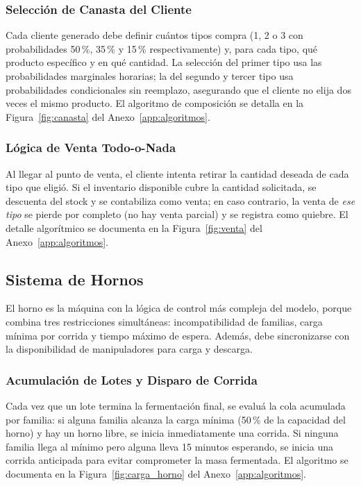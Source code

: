 \documentclass[10pt, a4paper]{article}
\begin{document}
\subsubsection{Selecci\'on de Canasta del Cliente}

Cada cliente generado debe definir cu\'antos tipos compra (1, 2 o 3 con
probabilidades 50\,\%, 35\,\% y 15\,\% respectivamente) y, para cada tipo,
qu\'e producto espec\'ifico y en qu\'e cantidad. La selecci\'on del primer
tipo usa las probabilidades marginales horarias; la del segundo y tercer tipo
usa probabilidades condicionales sin reemplazo, asegurando que el cliente no
elija dos veces el mismo producto. El algoritmo de composici\'on se detalla
en la Figura~\ref{fig:canasta} del Anexo~\ref{app:algoritmos}.

\subsubsection{L\'ogica de Venta Todo-o-Nada}

Al llegar al punto de venta, el cliente intenta retirar la cantidad deseada
de cada tipo que eligi\'o. Si el inventario disponible cubre la cantidad
solicitada, se descuenta del stock y se contabiliza como venta; en caso
contrario, la venta de \emph{ese tipo} se pierde por completo (no hay venta
parcial) y se registra como quiebre. El detalle algor\'itmico se documenta
en la Figura~\ref{fig:venta} del Anexo~\ref{app:algoritmos}.

\subsection{Sistema de Hornos}

El horno es la m\'aquina con la l\'ogica de control m\'as compleja del modelo,
porque combina tres restricciones simult\'aneas: incompatibilidad de familias,
carga m\'inima por corrida y tiempo m\'aximo de espera. Adem\'as, debe
sincronizarse con la disponibilidad de manipuladores para carga y descarga.

\subsubsection{Acumulaci\'on de Lotes y Disparo de Corrida}

Cada vez que un lote termina la fermentaci\'on final, se evalu\'a la cola
acumulada por familia: si alguna familia alcanza la carga m\'inima (50\,\% de la
capacidad del horno) y hay un horno libre, se inicia inmediatamente una
corrida. Si ninguna familia llega al m\'inimo pero alguna lleva 15 minutos
esperando, se inicia una corrida anticipada para evitar comprometer la masa
fermentada. El algoritmo se documenta en la Figura~\ref{fig:carga_horno} del
Anexo~\ref{app:algoritmos}.
\end{document}
